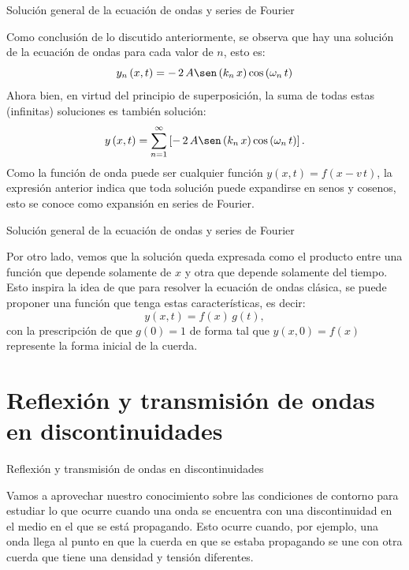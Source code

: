 \documentclass[11pt,handout,aspectratio=1610]{beamer}
\begin{document}
\begin{frame}{Solución general de la ecuación de ondas y series de Fourier}

    Como conclusión de lo discutido anteriormente, se observa que hay una solución de la ecuación de ondas para cada valor de $n$, esto es: $$ y_n \left(x,t\right) = - \, 2 \, A \sen \left(k_n \, x\right) \cos \left(\omega_n \, t\right) $$ Ahora bien, en virtud del principio de superposición, la suma de todas estas (infinitas) soluciones es también solución: $$ y \left(x,t\right) = \sum_{n=1}^{\infty} \left[- \, 2 \, A \sen \left(k_n \, x\right) \cos \left(\omega_n \, t\right)\right]. $$ Como la función de onda puede ser cualquier función $y \left(x,t\right) = f \left(x - v \, t\right)$, la expresión anterior indica que toda solución puede expandirse en senos y cosenos, esto se conoce como expansión en series de Fourier.

\end{frame}

\begin{frame}{Solución general de la ecuación de ondas y series de Fourier}

    Por otro lado, vemos que la solución queda expresada como el producto entre una función que depende solamente de $x$ y otra que depende solamente del tiempo. Esto inspira la idea de que para resolver la ecuación de ondas clásica, se puede proponer una función que tenga estas características, es decir: $$ y \left(x,t\right) = f(x) \, g(t),$$ con la prescripción de que $g (0) = 1$ de forma tal que $y\left(x,0\right) = f(x)$ represente la forma inicial de la cuerda.

\end{frame}

\section{Reflexión y transmisión de ondas en discontinuidades}

\begin{frame}{Reflexión y transmisión de ondas en discontinuidades}

    Vamos a aprovechar nuestro conocimiento sobre las condiciones de contorno para estudiar lo que ocurre cuando una onda se encuentra con una discontinuidad en el medio en el que se está propagando. Esto ocurre cuando, por ejemplo, una onda llega al punto en que la cuerda en que se estaba propagando se une con otra cuerda que tiene una densidad y tensión diferentes.

\end{frame}
\end{document}
